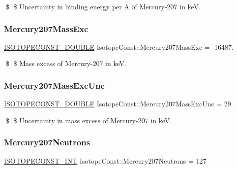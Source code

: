 \$ \$ Uncertainty in binding energy per A of Mercury-\/207 in keV. \mbox{\label{group___isotope_const-_mercury-_hg207_gaba1f319f9e283dfca84867fe6fbcd486}} 
\subsubsection{\texorpdfstring{Mercury207\+Mass\+Exc}{Mercury207MassExc}}
{\footnotesize\ttfamily \mbox{\hyperlink{group___isotope_const-_macros_ga8f45a7272ce02c0b4c65c44636ed719a}{I\+S\+O\+T\+O\+P\+E\+C\+O\+N\+S\+T\+\_\+\+D\+O\+U\+B\+LE}} Isotope\+Const\+::\+Mercury207\+Mass\+Exc = -\/16487.}

\$ \$ Mass excess of Mercury-\/207 in keV. \mbox{\label{group___isotope_const-_mercury-_hg207_gaea5121671fbe8a6ba41f95a00cf5f6d3}} 
\subsubsection{\texorpdfstring{Mercury207\+Mass\+Exc\+Unc}{Mercury207MassExcUnc}}
{\footnotesize\ttfamily \mbox{\hyperlink{group___isotope_const-_macros_ga8f45a7272ce02c0b4c65c44636ed719a}{I\+S\+O\+T\+O\+P\+E\+C\+O\+N\+S\+T\+\_\+\+D\+O\+U\+B\+LE}} Isotope\+Const\+::\+Mercury207\+Mass\+Exc\+Unc = 29.}

\$ \$ Uncertainty in mass excess of Mercury-\/207 in keV. \mbox{\label{group___isotope_const-_mercury-_hg207_ga20874f92826d3685a34e6eebc13a5396}} 
\subsubsection{\texorpdfstring{Mercury207\+Neutrons}{Mercury207Neutrons}}
{\footnotesize\ttfamily \mbox{\hyperlink{group___isotope_const-_macros_ga5f18360b3e99483a35c32d789e62621c}{I\+S\+O\+T\+O\+P\+E\+C\+O\+N\+S\+T\+\_\+\+I\+NT}} Isotope\+Const\+::\+Mercury207\+Neutrons = 127}

